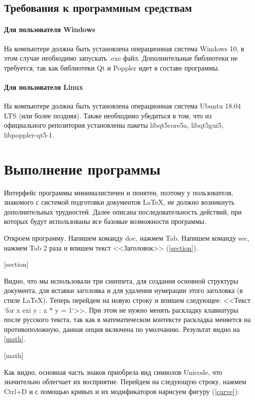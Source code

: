 \documentclass[opermanual]{espd}
\begin{document}
\subsection{Требования к программным средствам}
\paragraph{Для пользователя Windows}
На компьютере должна быть установлена операционная система Windows 10, в этом случае необходимо запускать .exe файл. Дополнительные библиотеки не требуется, так как библиотеки Qt и Poppler идет в составе программы.

\paragraph{Для пользователя Linux}
На компьютере должна быть установлена операционная система Ubuntu 18.04 LTS (или более поздняя). Также необходимо убедиться в том, что из официального репозитория установлены пакеты libqt5core5a, libqt5gui5, libpoppler-qt5-1.

\section{Выполнение программы}
Интерфейс программы минималистичен и понятен, поэтому у пользователя, знакомого с системой подготовки документов LaTeX, не должно возникнуть дополнительных трудностей. Далее описана последовательность действий, при которых будут использованы все базовые возможности программы.

Откроем программу. Напишем команду doc, нажмем Tab. Напишем команду sec, нажмем Tab 2 раза и впишем текст <<Заголовок>> (\ref{section}).

[section]

Видно, что мы использовали три сниппета, для создания основной структуры документа, для вставки заголовка и для удаления нумерации этого заголовка (в стиле LaTeX). Теперь перейдем на новую строку и впишем следующее: <<Текст `for x exi y : x * y = 1`>>. При этом не нужно менять раскладку клавиатуры после русского текста, так как в математическом контексте раскладка меняется на противоположную, данная опция включена по умолчанию. Результат видно на \ref{math}.

[math]

Как видно, основная часть знаков приобрела вид символов Unicode, что значительно облегчает их восприятие. Перейдем на следующую строку, нажмем Ctrl+D и с помощью кривых и их модификаторов нарисуем фигуру (\ref{curve}):
\end{document}

